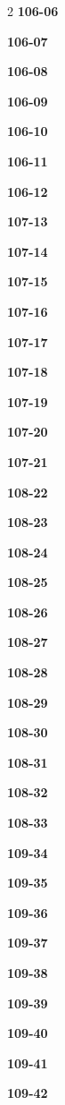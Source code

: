 \documentclass[10pt,a4paper]{article}
\begin{document}
\begin{multicols}{2}
\noindent\textbf{106-06}\ \par
\noindent\textbf{106-07}\ \par
\noindent\textbf{106-08}\ \par
\noindent\textbf{106-09}\ \par
\noindent\textbf{106-10}\ \par
\noindent\textbf{106-11}\ \par
\noindent\textbf{106-12}\ \par
\noindent\textbf{107-13}\ \par
\noindent\textbf{107-14}\ \par
\noindent\textbf{107-15}\ \par
\noindent\textbf{107-16}\ \par
\noindent\textbf{107-17}\ \par
\noindent\textbf{107-18}\ \par
\noindent\textbf{107-19}\ \par
\noindent\textbf{107-20}\ \par
\noindent\textbf{107-21}\ \par
\noindent\textbf{108-22}\ \par
\noindent\textbf{108-23}\ \par
\noindent\textbf{108-24}\ \par
\noindent\textbf{108-25}\ \par
\noindent\textbf{108-26}\ \par
\noindent\textbf{108-27}\ \par
\noindent\textbf{108-28}\ \par
\noindent\textbf{108-29}\ \par
\noindent\textbf{108-30}\ \par
\noindent\textbf{108-31}\ \par
\noindent\textbf{108-32}\ \par
\noindent\textbf{108-33}\ \par
\noindent\textbf{109-34}\ \par
\noindent\textbf{109-35}\ \par
\noindent\textbf{109-36}\ \par
\noindent\textbf{109-37}\ \par
\noindent\textbf{109-38}\ \par
\noindent\textbf{109-39}\ \par
\noindent\textbf{109-40}\ \par
\noindent\textbf{109-41}\ \par
\noindent\textbf{109-42}\ \par

\end{multicols}
\end{document}
